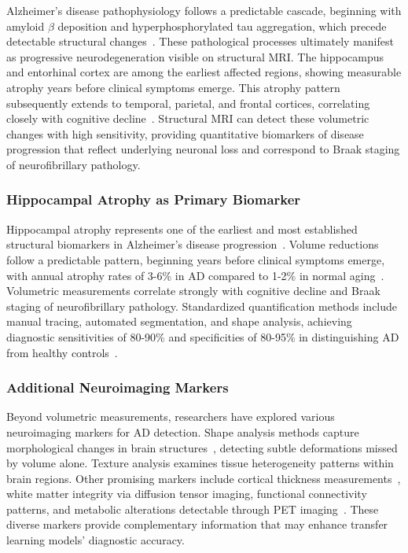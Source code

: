 \documentclass[12pt, a4paper]{article}
\begin{document}
Alzheimer's disease pathophysiology follows a predictable cascade, beginning with amyloid $\beta$ deposition and hyperphosphorylated tau aggregation, which precede detectable structural changes~\cite{jack2013tracking}. These pathological processes ultimately manifest as progressive neurodegeneration visible on structural MRI. The hippocampus and entorhinal cortex are among the earliest affected regions, showing measurable atrophy years before clinical symptoms emerge. This atrophy pattern subsequently extends to temporal, parietal, and frontal cortices, correlating closely with cognitive decline~\cite{vemuri2010role}. Structural MRI can detect these volumetric changes with high sensitivity, providing quantitative biomarkers of disease progression that reflect underlying neuronal loss and correspond to Braak staging of neurofibrillary pathology.

\subsubsection{Hippocampal Atrophy as Primary Biomarker}

Hippocampal atrophy represents one of the earliest and most established structural biomarkers in Alzheimer's disease progression~\cite{jack1992mr}. Volume reductions follow a predictable pattern, beginning years before clinical symptoms emerge, with annual atrophy rates of 3-6\% in AD compared to 1-2\% in normal aging~\cite{vemuri2010role}. Volumetric measurements correlate strongly with cognitive decline and Braak staging of neurofibrillary pathology. Standardized quantification methods include manual tracing, automated segmentation, and shape analysis, achieving diagnostic sensitivities of 80-90\% and specificities of 80-95\% in distinguishing AD from healthy controls~\cite{cuingnet2011automatic}.

\subsubsection{Additional Neuroimaging Markers}

Beyond volumetric measurements, researchers have explored various neuroimaging markers for AD detection. Shape analysis methods capture morphological changes in brain structures~\cite{ferrarini2006shape}, detecting subtle deformations missed by volume alone. Texture analysis examines tissue heterogeneity patterns within brain regions. Other promising markers include cortical thickness measurements~\cite{gutierrez2009patterns}, white matter integrity via diffusion tensor imaging, functional connectivity patterns, and metabolic alterations detectable through PET imaging~\cite{vemuri2010role}. These diverse markers provide complementary information that may enhance transfer learning models' diagnostic accuracy.
\end{document}
